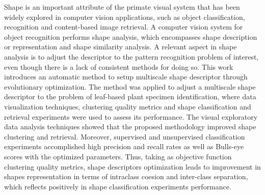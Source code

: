 \begin{comment}
 Shape is an important atribute of the primate visual system for object recognition. This atribute has been widely explored in computer vision applications, such as object classification, recognition and content-based image retrieval. A computer vision system for object recognition performs shape analysis, which encompasses shape description or representation and shape similarity analysis. In this work, we investigate the use of information theory concepts in shape analysis and thus, we propose a new methodology for shape analysis which relies on the multiscale bending energy and the concept of differential entropy. We also apply divergence measures to evaluate shapes similarity based on histograms of its contour signatures.
Moreover, we introduced an evolutionary optimization methodology for parameter adjustment of multiscale shape descriptors. 
We carried out experiments on shapes from public image data sets. The methodology for performance assessment of the algorithms and results comprised data visualization techniques, clustering quality evaluation measures and shape classification and retrieval experiments. 
The visual exploratory data analysis techniques showed that the proposed methodology for parameter adjustment of shape descriptors  improved shape clustering and retrieval. Moreover, unsupervised classification experiments accomplished high Precision and Recall rates as well as Bulls-eye scores with the optimized parameters.  Finally, the results led us to conclude that information theory concepts are suitable for shape and similarity analysis. 
\end{comment}


Shape is an important attribute of the primate visual system that has been widely explored in computer vision applications, such as object classification, recognition and content-based image retrieval. A computer vision system for object recognition performs shape analysis, which encompasses shape description or representation and shape similarity analysis. A relevant aspect in shape analysis is to adjust the descriptor to the pattern recognition problem of interest, even though there is a lack of consistent methods for doing so.  This work introduces an automatic method to setup multiscale shape descriptor through evolutionary optimization. The method was applied to adjust a multiscale shape descriptor to the problem of leaf-based plant specimen identification, where data visualization techniques, clustering quality metrics and shape classification and retrieval experiments were used to assess its performance. The visual exploratory data analysis techniques showed that the proposed methodology improved shape clustering and retrieval. Moreover, supervised and unsupervised classification experiments accomplished high precision and recall rates as well as Bulls-eye scores with the optimized parameters. Thus, taking as objective function clustering quality metrics, shape descriptors optimization leads to improvement in shapes representation in terms of intraclass coesion and inter-class separation, which reflects positively in shape classification experiments performance.    

